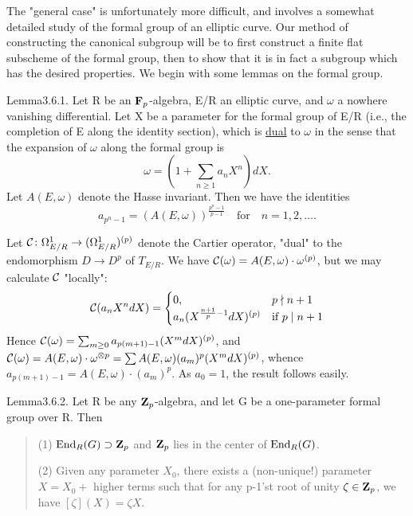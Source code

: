
 The "general case" is unfortunately more difficult, and involves
a somewhat detailed study of the formal group of an elliptic curve. Our method
of constructing the canonical subgroup will be to first construct a finite flat
subscheme of the formal group, then to show that it is in fact a subgroup which
has the desired properties. We begin with some lemmas on the formal group.


\begin{kathm}{Lemma}{3.6.1.}
Let R be an $\mathbf{F}_p$-algebra, E/R an elliptic curve, and $\omega$ a nowhere
vanishing differential. Let X be a parameter for the formal group of E/R
(i.e., the completion of E along the identity section), which is \uline{dual}
to $\omega$ in the sense that the expansion of $\omega$ along the formal group
is
\[
\omega = (1 + \sum_{n\geq 1} a_n X^n)dX.
\]
Let $A(E,\omega)$ denote the Hasse invariant. Then we have the identities
\[
a_{p^n-1} = (A(E,\omega))^{\frac{p^n-1}{p-1}} \quad\text{for}\quad n=1,2,\dots.
\]
\end{kathm}

\begin{kaproof}
Let $\mathcal{C}\colon \Omega^1_{E/R}\to(\Omega^1_{E/R})^{(p)}$ denote the Cartier
operator, "dual" to the endomorphism $D\to D^p$ of $T_{E/R}$. We have
$\mathcal{C}(\omega) = A(E,\omega)\cdot\omega^{(p)}$, but we may calculate $\mathcal{C}$
"locally":
\[
\mathcal{C}(a_n X^n dX) = \begin{cases} 0, & p\nmid n+1 \\ a_n(X^{\frac{n+1}{p}-1}dX)^{(p)} & \text{if } p\mid n+1 \end{cases}
\]
Hence $\mathcal{C}(\omega) = \sum_{m\geq 0} a_{p(m+1)-1}(X^m dX)^{(p)}$, and
$\mathcal{C}(\omega) = A(E,\omega)\cdot\omega^{\otimes p} =
\sum A(E,\omega)(a_m)^p(X^m dX)^{(p)}$, whence
$a_{p(m+1)-1} = A(E,\omega)\cdot(a_m)^p$. As $a_0=1$, the result follows easily.
\end{kaproof}

\begin{kathm}{Lemma}{3.6.2.}
Let R be any $\mathbf{Z}_p$-algebra, and let G be a one-parameter formal group over R.
Then
\begin{quote}
(1) $\operatorname{End}_R(G)\supset \mathbf{Z}_p$ and $\mathbf{Z}_p$ lies in the center of $\operatorname{End}_R(G)$.

(2) Given any parameter $X_0$, there exists a (non-unique!) parameter
$X = X_0 +$ higher terms such that for any p-1'st root of unity $\zeta\in\mathbf{Z}_p$,
we have $[\zeta](X) = \zeta X$.
\end{quote}
\end{kathm}


